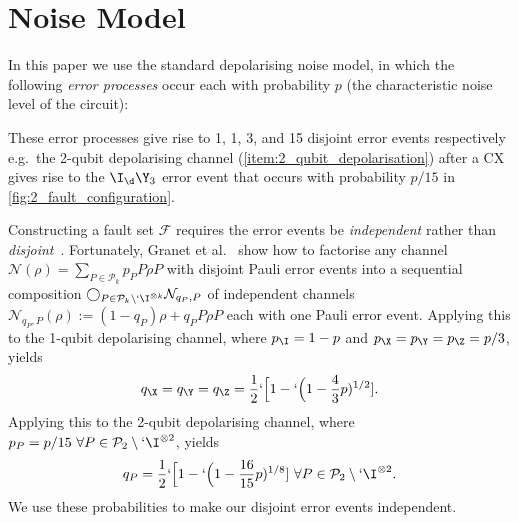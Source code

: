 \section{Noise Model}
\label{sec:noise_model}
In this paper we use the standard depolarising noise model,
in which the following \emph{error processes} occur each with probability $p$
(the characteristic noise level of the circuit):
These error processes give rise to 1, 1, 3, and 15 disjoint error events respectively
e.g.\ the 2-qubit depolarising channel (\cref{item:2_qubit_depolarisation}) after a CX
gives rise to the $\I_\d \Y_3$ error event that occurs with probability $p/15$
in \cref{fig:2_fault_configuration}.

Constructing a fault set $\mathcal F$ requires
the error events be \emph{independent} rather than \emph{disjoint}~\cite[\S 4.1]{Umbrarescu2026}.
Fortunately,
Granet et al.~\cite[\S III.C.1]{Granet2025} show how to factorise
any channel $\mathcal N(\rho) =\sum_{P \in \mathcal{P}_k} p_P P \rho P$
with disjoint Pauli error events into a sequential composition
$\bigcirc_{P \in \mathcal{P}_k \setminus `{\I^{\otimes k}}} \mathcal N_{q_P, P}$
of independent channels
$\mathcal N_{q_P, P}(\rho) :=(1 -q_P)\rho +q_P P \rho P$
each with one Pauli error event.
Applying this to the 1-qubit depolarising channel,
where $p_\I =1 -p$ and $p_\X =p_\Y =p_\Z =p/3$, yields
\begin{equation}
	q_\X =q_\Y =q_\Z =\frac{1}{2}`\Big[1 - `\Big(1 -\frac{4}{3}p)^{1/2}].
\end{equation}
Applying this to the 2-qubit depolarising channel,
where $p_P =p/15~\forall P \in \mathcal P_2 \setminus `{\I^{\otimes 2}}$,
yields
\begin{equation}
	q_P =\frac{1}{2}`\Big[1 -`\Big(1 -\frac{16}{15}p)^{1/8}]
	~\forall P \in \mathcal P_2 \setminus `{\I^{\otimes 2}}.
\end{equation}
We use these probabilities to make our disjoint error events independent.